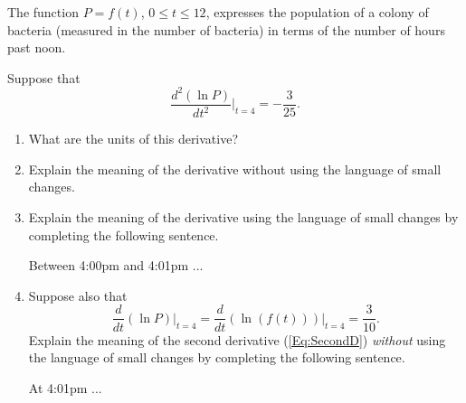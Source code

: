 \documentclass{ximera}
\begin{document}
\begin{question}  \label{Qghldfdfgng}
The function $P=f(t)$, $0\leq t \leq 12$, expresses the population of a colony of bacteria (measured in the number of bacteria) in terms of the number of hours past noon.

Suppose that
\begin{equation}
   \frac{d^2 \left(  \ln P \right)}{dt^2} \Big|_{t=4} =  -\frac{3}{25} .  \label{Eq:SecondD}
\end{equation}


\begin{enumerate}
\item What are the units of this derivative?

\item Explain the meaning of the derivative without using the language of small changes.

\item Explain the meaning of the derivative using the language of small changes by completing the following sentence.

Between 4:00pm and 4:01pm  ...

\item Suppose also that
\[
   \frac{d}{dt} \left(  \ln P \right)\Big|_{t=4} = \frac{d}{dt} \left(  \ln (f(t)) \right)\Big|_{t=4}  = \frac{3}{10} .
\]
Explain the meaning of the second derivative (\ref{Eq:SecondD}) \emph{without} using the language of small changes by completing the following sentence.

At 4:01pm  ...

\end{enumerate}
\end{question}
\end{document}
